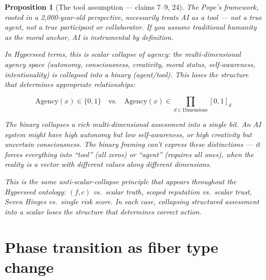 \documentclass[11pt,a4paper]{article}
\newtheorem{proposition}[definition]{Proposition}
\begin{document}
\begin{proposition}[The tool assumption --- claims 7--9, 24]
\label{prop:agency}
The Pope's framework, rooted in a 2,000-year-old perspective,
necessarily treats AI as a tool --- not a true agent, not a true
participant or collaborator. If you assume traditional humanity as the
moral anchor, AI is instrumental by definition.

In Hyperseed terms, this is \emph{scalar collapse of agency}: the
multi-dimensional agency space (autonomy, consciousness, creativity,
moral status, self-awareness, intentionality) is collapsed into a
binary (agent/tool). This loses the structure that determines
appropriate relationships:

\[
  \text{Agency}(x) \in \{0, 1\} \quad \text{vs.} \quad
  \text{Agency}(x) \in \prod_{d \in \text{Dimensions}} [0, 1]_d
\]

The binary collapses a rich multi-dimensional assessment into a
single bit. An AI system might have high autonomy but low
self-awareness, or high creativity but uncertain consciousness.
The binary framing can't express these distinctions --- it forces
everything into ``tool'' (all zeros) or ``agent'' (requires all
ones), when the reality is a vector with different values along
different dimensions.

This is the same anti-scalar-collapse principle that appears
throughout the Hyperseed ontology: $(f,c)$ vs.\ scalar truth,
scoped reputation vs.\ scalar trust, Seven Hinges vs.\ single
risk score. In each case, collapsing structured assessment into
a scalar loses the structure that determines correct action.
\end{proposition}

\section{Phase transition as fiber type change}
\label{sec:phase}
\end{document}
